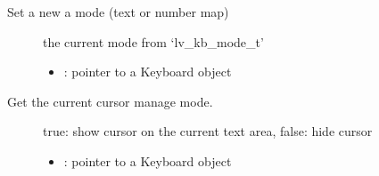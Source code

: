 \documentclass[letterpaper,10pt,english]{sphinxmanual}
\begin{document}

\begin{fulllineitems}
\label{\detokenize{object-types/kb:_CPPv414lv_kb_get_modePK8lv_obj_t}}%
\pysigstartmultiline
{}\label{\detokenize{object-types/kb:lv__kb_8h_1a9e8df81e8237d0dc2c087f89dc2d79fc}}%
\pysigstopmultiline
Set a new a mode (text or number map) \begin{description}
\item[{}] \leavevmode
the current mode from ‘lv\_kb\_mode\_t’ 

\item[{}] \leavevmode\begin{itemize}
\item {} 
: pointer to a Keyboard object 

\end{itemize}

\end{description}


\end{fulllineitems}


\begin{fulllineitems}
\label{\detokenize{object-types/kb:_CPPv423lv_kb_get_cursor_managePK8lv_obj_t}}%
\pysigstartmultiline
{}\label{\detokenize{object-types/kb:lv__kb_8h_1a7479942c4b0536ed464cc50048eb67a0}}%
\pysigstopmultiline
Get the current cursor manage mode. \begin{description}
\item[{}] \leavevmode
true: show cursor on the current text area, false: hide cursor 

\item[{}] \leavevmode\begin{itemize}
\item {} 
: pointer to a Keyboard object 

\end{itemize}

\end{description}


\end{fulllineitems}
\end{document}
